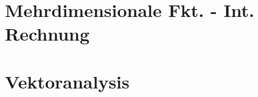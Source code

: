 \documentclass[8pt]{mpscheatsheet}
\begin{document}
     \section{Mehrdimensionale Fkt. - Int. Rechnung}
         
         
         
         
         
         
         
         
         
     \section{Vektoranalysis}
         
         
         
         
         
\end{document}
